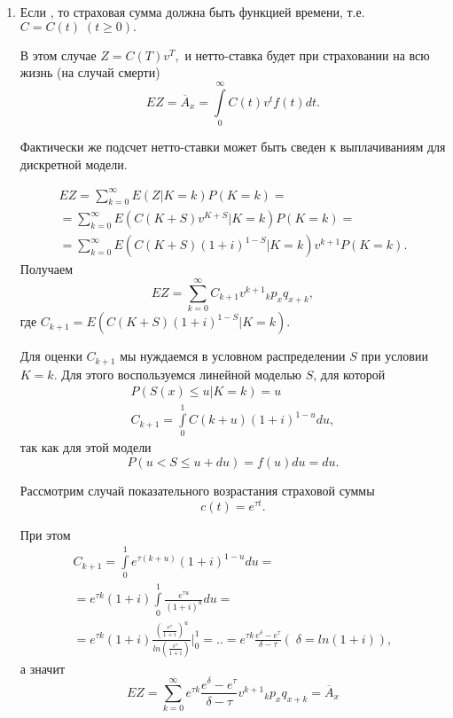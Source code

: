 \begin{enumerate}
\begin{enumerate}
			\item Если , то страховая сумма должна быть функцией времени, т.е. $ C = C(t)\;(t \geq 0).$

			В этом случае $ Z = C(T)v^T,$ и нетто-ставка будет при страховании на всю жизнь (на случай смерти)
			\[ EZ = \overline{A}_x = \int\limits^{\infty}_{0}C(t)v^tf(t)dt. \]

			Фактически же подсчет нетто-ставки может быть сведен к выплачиваниям для дискретной модели.

			\begin{gather*}
				EZ = \sum\limits_{k=0}^{\infty}E(Z|K = k)P(K=k) = \\
				=\sum\limits_{k=0}^{\infty}E(C(K+S)v^{K+S}| K = k)P(K=k)=\\
				=\sum\limits_{k=0}^{\infty}E(C(K+S)(1+i)^{1-S}| K=k)v^{k+1}P(K=k).
			\end{gather*}
			Получаем
			\[
				EZ = \sum\limits_{k=0}^{\infty}C_{k+1}v^{k+1}{}_kp_xq_{x+k},
			\]
			где $ C_{k+1} = E(C(K+S)(1+i)^{1-S}|K=k).$

			Для оценки $ C_{k+1}$ мы нуждаемся в условном распределении $ S$ при условии $ K=k.$ Для этого воспользуемся линейной моделью $ S$, для которой
			\begin{gather*}
				P(S(x) \leq u|K=k) =u\\
				C_{k+1} = \int\limits^{1}_{0}C(k+u)(1+i)^{1-u}du, 
			\end{gather*}
			так как для этой модели \[	P(u < S \leq u +du) = f(u)du = du. \]

			\begin{example}
				Рассмотрим случай показательного возрастания страховой суммы
				\[c(t)=e^{\tau t}.\]

				При этом 
				\begin{gather*}
					C_{k+1} = \int\limits^{1}_{0}e^{\tau (k+u)}(1+i)^{1-u}du=\\
					=e^{\tau k}(1+i)\int\limits^{1}_{0}\frac{e^{\tau u}}{(1+i)^u}du=\\
					=e^{\tau k}(1+i)\frac{(\frac{e^\tau}{1+i})^u}{ln(\frac{e^\tau}{1+i})} |^1_0 = ..=e^{\tau k}\frac{e^\delta - e^\tau}{\delta - \tau}(\; \delta = ln(1+i)),
				\end{gather*}
				а значит \[ EZ = \sum\limits_{k=0}^{\infty}e^{\tau k}\frac{e^\delta - e^\tau}{\delta - \tau}v^{k+1}{}_kp_xq_{x+k} = \overline{A}_x \]
			\end{example}
		\end{enumerate}
\end{enumerate}

